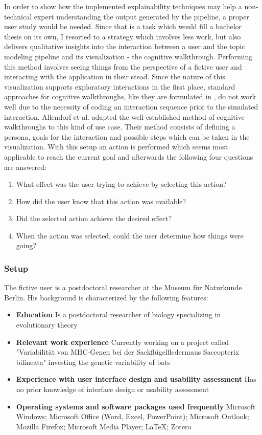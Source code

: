 In order to show how the implemented explainability techniques may help a non-technical expert understanding the output generated by the pipeline, a proper user study would be needed. Since that is a task which would fill a bachelor thesis on its own, I resorted to a strategy which involves less work, but also delivers qualitative insights into the interaction between a user and the topic modeling pipeline and its visualization - the cognitive walkthrough. Performing this method involves seeing things from the perspective of a fictive user and interacting with the application in their stead.
Since the nature of this visualization supports exploratory interactions in the first place, standard approaches for cognitive walkthroughs, like they are formulated in \cite{whartonUsabilityInspectionMethods1994}, do not work well due to the necessity of coding an interaction sequence prior to the simulated interaction. Allendorf et al. \cite{allendoerferAdaptingCognitiveWalkthrough2005} adapted the well-established method of cognitive walkthroughs to this kind of use case. Their method consists of defining a persona, goals for the interaction and possible steps which can be taken in the visualization. With this setup an action is performed which seems most applicable to reach the current goal and afterwards the following four questions are answered:
\begin{enumerate}
	\item What effect was the user trying to achieve by selecting this action?
	\item How did the user know that this action was available?
	\item Did the selected action achieve the desired effect?
	\item When the action was selected, could the user determine how things were going?
\end{enumerate}

\subsubsection{Setup}
The fictive user is a postdoctoral researcher at the Museum für Naturkunde Berlin. His background is characterized by the following features:
\begin{itemize}
	\item \textbf{Education}
	Is a postdoctoral researcher of biology specializing in evolutionary theory
	
	\item \textbf{Relevant work experience}
	Currently working on a project called "Variabilität von MHC-Genen bei der Sackflügelfledermaus Saccopterix bilineata" investing the genetic variability of bats
	
	\item \textbf{Experience with user interface design and usability assessment}
	Has no prior knowledge of interface design or usability assessment
	
	\item \textbf{Operating systems and software packages used frequently}
	Microsoft Windows; Microsoft Office (Word, Excel, PowerPoint); Microsoft Outlook; Mozilla Firefox; Microsoft Media Player; LaTeX; Zotero
\end{itemize}

